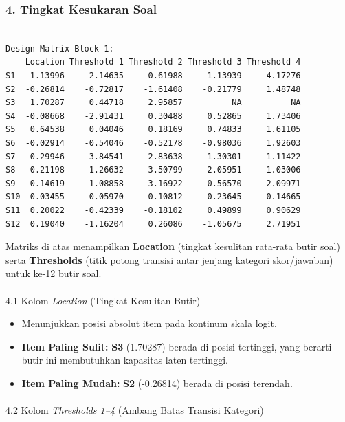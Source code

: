 \documentclass[
]{article}
\makeatletter
\let\oldparagraph\paragraph
\renewcommand{\paragraph}{
    \@ifstar
      \xxxParagraphStar
      \xxxParagraphNoStar
  }
\newcommand{\xxxParagraphStar}[1]{\oldparagraph*{#1}\mbox{}}
\newcommand{\xxxParagraphNoStar}[1]{\oldparagraph{#1}\mbox{}}
\makeatother
\begin{document}
\subsubsection{4. Tingkat Kesukaran Soal}\label{tingkat-kesukaran-soal}

\begin{verbatim}

Design Matrix Block 1:
    Location Threshold 1 Threshold 2 Threshold 3 Threshold 4
S1   1.13996     2.14635    -0.61988    -1.13939     4.17276
S2  -0.26814    -0.72817    -1.61408    -0.21779     1.48748
S3   1.70287     0.44718     2.95857          NA          NA
S4  -0.08668    -2.91431     0.30488     0.52865     1.73406
S5   0.64538     0.04046     0.18169     0.74833     1.61105
S6  -0.02914    -0.54046    -0.52178    -0.98036     1.92603
S7   0.29946     3.84541    -2.83638     1.30301    -1.11422
S8   0.21198     1.26632    -3.50799     2.05951     1.03006
S9   0.14619     1.08858    -3.16922     0.56570     2.09971
S10 -0.03455     0.05970    -0.10812    -0.23645     0.14665
S11  0.20022    -0.42339    -0.18102     0.49899     0.90629
S12  0.19040    -1.16204     0.26086    -1.05675     2.71951
\end{verbatim}

Matriks di atas menampilkan \textbf{Location} (tingkat kesulitan
rata-rata butir soal) serta \textbf{Thresholds} (titik potong transisi
antar jenjang kategori skor/jawaban) untuk ke-12 butir soal.

\paragraph{\texorpdfstring{4.1 Kolom \emph{Location} (Tingkat Kesulitan
Butir)}{4.1 Kolom Location (Tingkat Kesulitan Butir)}}\label{kolom-location-tingkat-kesulitan-butir}

\begin{itemize}
\item
  Menunjukkan posisi absolut item pada kontinum skala logit.
\item
  \textbf{Item Paling Sulit:} \textbf{S3} (1.70287) berada di posisi
  tertinggi, yang berarti butir ini membutuhkan kapasitas laten
  tertinggi.
\item
  \textbf{Item Paling Mudah:} \textbf{S2} (-0.26814) berada di posisi
  terendah.
\end{itemize}

\paragraph{\texorpdfstring{4.2 Kolom \emph{Thresholds 1--4} (Ambang
Batas Transisi
Kategori)}{4.2 Kolom Thresholds 1--4 (Ambang Batas Transisi Kategori)}}\label{kolom-thresholds-14-ambang-batas-transisi-kategori}
\end{document}
